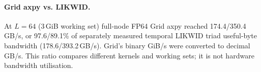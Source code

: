 \paragraph{Grid axpy vs. LIKWID.}
At $L=64$ (3\,GiB working set) full-node FP64 Grid axpy reached
174.4/350.4\,GB/s, or 97.6/89.1\% of separately measured temporal
LIKWID triad useful-byte bandwidth (178.6/393.2\,GB/s). Grid's binary
GiB/s were converted to decimal GB/s. This ratio compares different kernels
and working sets; it is not hardware bandwidth utilisation.

